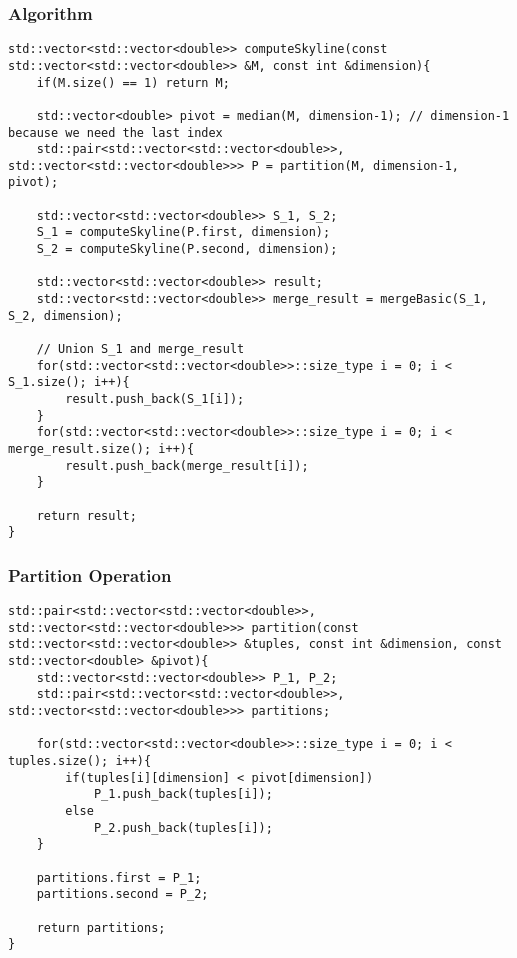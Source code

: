 \subsubsection{{\large Algorithm}}
\begin{verbatim}
std::vector<std::vector<double>> computeSkyline(const std::vector<std::vector<double>> &M, const int &dimension){
	if(M.size() == 1) return M;
	
	std::vector<double> pivot = median(M, dimension-1); // dimension-1 because we need the last index
	std::pair<std::vector<std::vector<double>>, std::vector<std::vector<double>>> P = partition(M, dimension-1, pivot);
	
	std::vector<std::vector<double>> S_1, S_2;
	S_1 = computeSkyline(P.first, dimension);
	S_2 = computeSkyline(P.second, dimension);
	
	std::vector<std::vector<double>> result;
	std::vector<std::vector<double>> merge_result = mergeBasic(S_1, S_2, dimension);
	
	// Union S_1 and merge_result
	for(std::vector<std::vector<double>>::size_type i = 0; i < S_1.size(); i++){
		result.push_back(S_1[i]);
	}
	for(std::vector<std::vector<double>>::size_type i = 0; i < merge_result.size(); i++){
		result.push_back(merge_result[i]);
	}
	
	return result;
}
\end{verbatim}

\subsubsection{{\large Partition Operation}}
\begin{verbatim}
std::pair<std::vector<std::vector<double>>, std::vector<std::vector<double>>> partition(const std::vector<std::vector<double>> &tuples, const int &dimension, const std::vector<double> &pivot){
	std::vector<std::vector<double>> P_1, P_2;
	std::pair<std::vector<std::vector<double>>, std::vector<std::vector<double>>> partitions;
	
	for(std::vector<std::vector<double>>::size_type i = 0; i < tuples.size(); i++){
		if(tuples[i][dimension] < pivot[dimension])
			P_1.push_back(tuples[i]);
		else
			P_2.push_back(tuples[i]);
	}
	
	partitions.first = P_1;
	partitions.second = P_2;
	
	return partitions;
}
\end{verbatim}
